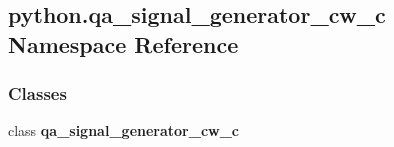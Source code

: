\subsection{python.\+qa\+\_\+signal\+\_\+generator\+\_\+cw\+\_\+c Namespace Reference}
\label{namespacepython_1_1qa__signal__generator__cw__c}
\subsubsection*{Classes}
\begin{DoxyCompactItemize}
\item 
class {\bf qa\+\_\+signal\+\_\+generator\+\_\+cw\+\_\+c}
\end{DoxyCompactItemize}
